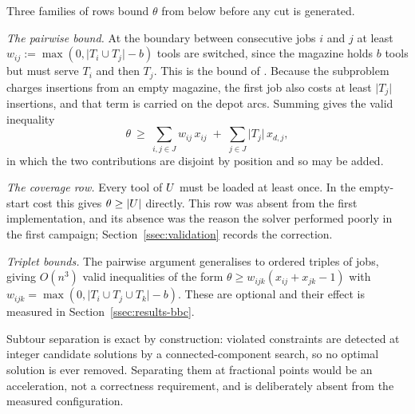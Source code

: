 Three families of rows bound $\theta$ from below before any cut is generated.

\emph{The pairwise bound.} At the boundary between consecutive jobs $i$ and $j$ at
least $w_{ij}:=\max(0,\lvert T_i\cup T_j\rvert-b)$ tools are switched, since the
magazine holds $b$ tools but must serve $T_i$ and then $T_j$. This is the bound of
\citet{Tang1988}. Because the subproblem charges insertions from an empty magazine,
the first job also costs at least $\lvert T_{j}\rvert$ insertions, and that term is
carried on the depot arcs. Summing gives the valid inequality
\[
  \theta\ \ge\ \sum_{i,j\in J} w_{ij}\,x_{ij}\;+\;\sum_{j\in J}\lvert T_j\rvert\,x_{d,j},
\]
in which the two contributions are disjoint by position and so may be added.

\emph{The coverage row.} Every tool of $U$ must be loaded at least once. In the
empty-start cost this gives $\theta\ge\lvert U\rvert$ directly. This row was absent
from the first implementation, and its absence was the reason the solver performed
poorly in the first campaign; Section~\ref{ssec:validation} records the correction.

\emph{Triplet bounds.} The pairwise argument generalises to ordered triples of jobs,
giving $O(n^{3})$ valid inequalities of the form
$\theta\ge w_{ijk}(x_{ij}+x_{jk}-1)$ with
$w_{ijk}=\max(0,\lvert T_i\cup T_j\cup T_k\rvert-b)$. These are optional and their
effect is measured in Section~\ref{ssec:results-bbc}.

Subtour separation is exact by construction: violated constraints are detected at
integer candidate solutions by a connected-component search, so no optimal solution is
ever removed. Separating them at fractional points would be an acceleration, not a
correctness requirement, and is deliberately absent from the measured configuration.

